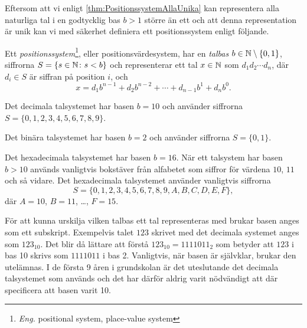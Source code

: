 Eftersom att vi enligt \cref{thm:PositionssystemAllaUnika} kan representera
alla naturliga tal i en godtycklig bas \(b>1\) större än ett och att denna
representation är unik kan vi med säkerhet definiera ett positionssystem enligt
följande.
\begin{definition}[Positionssystem]\label{def:Positionssystem}
  Ett \emph{positionssystem}\footnote{%
    \emph{Eng.} positional system, place-value system
  }, eller positionsvärdesystem, har en
  \emph{talbas} \(b \in \mathbb{N} \setminus \{0,1\}\),
  siffrorna \(S=\{s\in\mathbb{N}\colon s<b\}\) och representerar ett tal \(x\in\mathbb{N}\) som
  \(d_1d_2\cdots d_n\), där \(d_i \in S\) är siffran på position \(i\), och
  \begin{equation}
    \nonumber
    x = d_1 b^{n-1} + d_2 b^{n-2} + \cdots + d_{n-1} b^1 + d_n b^0.
  \end{equation}
\end{definition}

\begin{example}\label{ex:DecimalaTalsystemet}
  Det decimala talsystemet har basen \(b=10\) och använder siffrorna
  \(S=\{0,1,2,3,4,5,6,7,8,9\}\).
\end{example}
\begin{example}\label{ex:BinaraTalsystemet}
  Det binära talsystemet har basen \(b=2\) och använder siffrorna
  \(S=\{0,1\}\).
\end{example}
\begin{example}\label{ex:HexadecimalaTalsystemet}
  Det hexadecimala talsystemet har basen \(b=16\).
  När ett talsystem har basen \(b>10\) används vanligtvis bokstäver från
  alfabetet som siffror för värdena \(10\), \(11\) och så vidare.
  Det hexadecimala talsystemet använder vanligtvis
  siffrorna \[S=\{0,1,2,3,4,5,6,7,8,9,A,B,C,D,E,F\},\] där \(A=10\),
  \(B=11\), \dots, \(F=15\).
\end{example}

För att kunna urskilja vilken talbas ett tal representeras med brukar basen
anges som ett subskript.
Exempelvis talet \(123\) skrivet med det decimala systemet anges som
\(123_{10}\).
Det blir då lättare att förstå \(123_{10} = 1111011_2\) som betyder att \(123\)
i bas 10 skrivs som \(1111011\) i bas 2.
Vanligtvis, när basen är självklar, brukar den utelämnas.
I de första 9 åren i grundskolan är det uteslutande det decimala talsystemet
som används och det har därför aldrig varit nödvändigt att där specificera att
basen varit 10.

